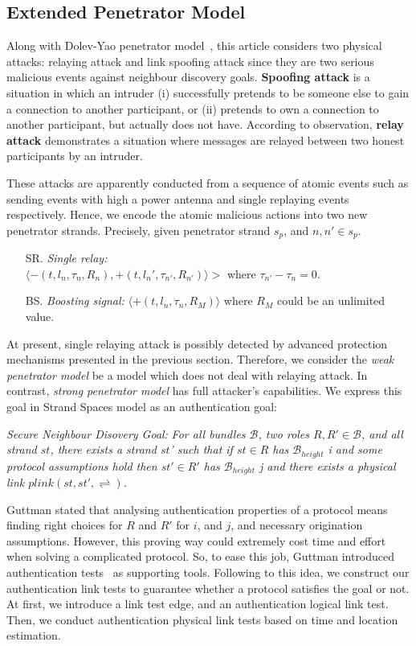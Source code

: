 \subsection{Extended Penetrator Model}\label{penndp2}

Along with Dolev-Yao penetrator model~\cite{dolev-yao}, this article considers two physical attacks: relaying attack and link spoofing attack since they are two serious malicious events against neighbour discovery goals. \textbf{Spoofing attack} is a situation in which an intruder (i) successfully pretends to be someone else to gain a connection to another participant, or (ii) pretends to own a connection to another participant, but actually does not have. According to observation, \textbf{relay attack} demonstrates a situation where messages are relayed between two honest participants by an intruder. 

These attacks are apparently conducted from a sequence of atomic events such as sending events with high a power antenna  and single replaying events respectively. Hence, we encode the atomic malicious actions into two new penetrator strands. Precisely, given penetrator strand $s_p$, and $n, n' \in s_p$. 
\begin{itemize}
\item[SR.] \emph{Single relay:} \\ $\langle -(t, l_n, \tau_{n}, R_n), +(t, l_n', \tau_{n'}, R_{n'}) \rangle >$ where $\tau_{n'} - \tau_{n} = 0$.
\item [BS.] \emph{Boosting signal:} $\langle +(t, l_n, \tau_{n}, R_M) \rangle$ where $R_M$ could be an unlimited value. 
\end{itemize}

At present, single relaying attack is possibly detected by advanced protection mechanisms presented in the previous section. Therefore, we consider the \emph{weak penetrator model} be a model which does not deal with relaying attack. In contrast, \emph{strong penetrator model} has full attacker's capabilities. 
We express this goal in Strand Spaces model as an authentication goal:

\emph{Secure Neighbour Disovery Goal:} \textit{For all bundles $\mathcal{B}$, two roles $R, R' \in \mathcal{B}$, and all strand $st$, there exists a strand $st$' such that if $st \in R$ has $ \mathcal{B}_{height}$ i and some protocol assumptions hold then $st' \in R'$ has $\mathcal{B}_{height}$ j and there exists a physical link $plink(st,st',\rightleftharpoons)$.}

Guttman stated that analysing authentication properties of a protocol means finding right choices for $R$ and $R'$ for $i$, and $j$, and necessary origination assumptions. However, this proving way could extremely cost time and effort when solving a complicated protocol. So, to ease this job, Guttman introduced authentication tests~\cite{authenticationtests} as supporting tools. Following to this idea, we construct our authentication link tests to guarantee whether a protocol satisfies the goal or not.  At first, we introduce a link test edge, and an authentication logical link test. Then, we conduct authentication physical link tests based on time and location estimation. 

